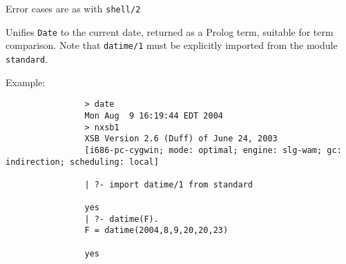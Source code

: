 \begin{description}
Error cases are as with {\tt shell/2}

%
Unifies {\tt Date} to the current date, returned as a Prolog term,
suitable for term comparison.  Note that {\tt datime/1} must be
explicitly imported from the module {\tt standard}.

Example:
{\footnotesize
\begin{verbatim}
                > date
                Mon Aug  9 16:19:44 EDT 2004
                > nxsb1
                XSB Version 2.6 (Duff) of June 24, 2003
                [i686-pc-cygwin; mode: optimal; engine: slg-wam; gc: indirection; scheduling: local]

                | ?- import datime/1 from standard

                yes
                | ?- datime(F).
                F = datime(2004,8,9,20,20,23)

                yes
\end{verbatim}}

\end{description}

